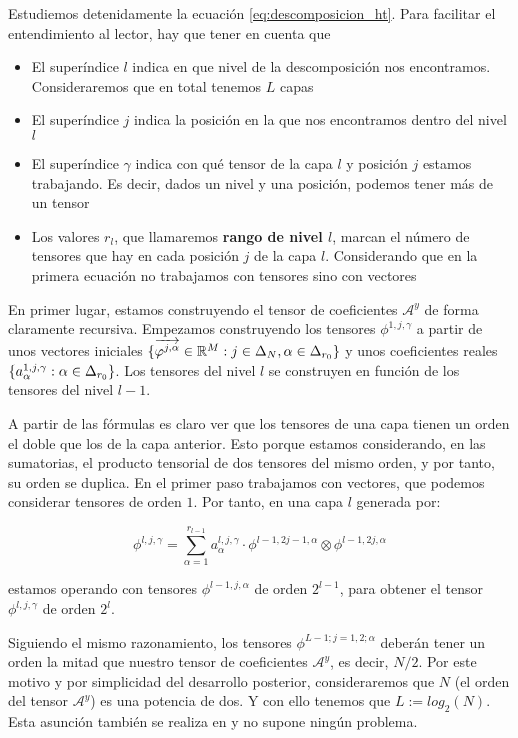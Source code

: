Estudiemos detenidamente la ecuación \eqref{eq:descomposicion_ht}. Para facilitar el entendimiento al lector, hay que tener en cuenta que

\begin{itemize}
    \item El superíndice $l$ indica en que nivel de la descomposición nos encontramos. Consideraremos que en total tenemos $L$ capas
    \item El superíndice $j$ indica la posición en la que nos encontramos dentro del nivel $l$
    \item El superíndice $\gamma$ indica con qué tensor de la capa $l$ y posición $j$ estamos trabajando. Es decir, dados un nivel y una posición, podemos tener más de un tensor
    \item Los valores $r_l$, que llamaremos \textbf{rango de nivel $l$}, marcan el número de tensores que hay en cada posición $j$ de la capa $l$. Considerando que en la primera ecuación no trabajamos con tensores sino con vectores
\end{itemize}

En primer lugar, estamos construyendo el tensor de coeficientes $\mathcal{A}^y$ de forma claramente recursiva. Empezamos construyendo los tensores $\phi^{1, j, \gamma}$ a partir de unos vectores iniciales $\{\overrightarrow{\varphi^{j, \alpha}} \in \mathbb{R}^M: j \in \Delta_{N}, \alpha \in \Delta_{r_0}  \}$  y unos coeficientes reales $\{a_{\alpha}^{1, j, \gamma}: \alpha \in \Delta_{r_0}\}$. Los tensores del nivel $l$ se construyen en función de los tensores del nivel $l-1$.

A partir de las fórmulas es claro ver que los tensores de una capa tienen un orden el doble que los de la capa anterior. Esto porque estamos considerando, en las sumatorias, el producto tensorial de dos tensores del mismo orden, y por tanto, su orden se duplica. En el primer paso trabajamos con vectores, que podemos considerar tensores de orden $1$. Por tanto, en una capa $l$ generada por:

\begin{equation}
    \phi^{l, j, \gamma} = \sum_{\alpha = 1}^{r_{l-1}} a_{\alpha}^{l, j, \gamma} \cdot \phi^{l-1, 2j-1, \alpha} \otimes \phi^{l-1, 2j, \alpha}
\end{equation}

estamos operando con tensores $\phi^{l-1, j, \alpha}$ de orden $2^{l-1}$, para obtener el tensor $\phi^{l, j, \gamma}$ de orden $2^l$.

Siguiendo el mismo razonamiento, los tensores $\phi^{L-1; j = 1, 2; \alpha}$ deberán tener un orden la mitad que nuestro tensor de coeficientes $\mathcal{A}^y$, es decir, $N / 2$. Por este motivo y por simplicidad del desarrollo posterior, consideraremos que $N$ (el orden del tensor $\mathcal{A}^y$) es una potencia de dos. Y con ello tenemos que $L := log_2(N)$. Esta asunción también se realiza en \cite{matematicas:descomposicion_ht} y no supone ningún problema.

